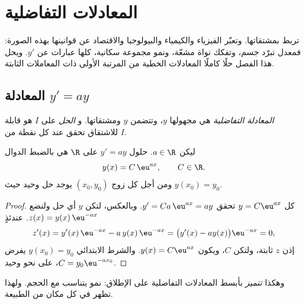 \chapter{المعادلات التفاضلية}\label{ch:g12:diffeq}

تربط   بمشتقاتها. وتعبّر الفيزياء
والكيمياء والبيولوجيا والاقتصاد عن قوانينها بهذه الصورة: فمعدل
تبرّد جسم، وتفكك نواة مشعّة، ونمو
مجموعة سكانية، كلها عبارات عن $y'$. ويحل هذا الفصل حلًا كاملًا
المعادلات الخطية من المرتبة الأولى ذات المعاملات الثابتة.

\section{المعادلة \texorpdfstring{$y' = ay$}{y' = ay}}

\begin{definition}\label{def:g12:diffeq:ode}
\emph{المعادلة التفاضلية} هي 
مجهولها  $y$، وتتضمن $y$ ومشتقاتها. و
\emph{الحل} على  $I$ هو  قابلة للاشتقاق تحقق
 عند كل نقطة من $I$.
\end{definition}

\begin{theorem}[حلول $y' = ay$]\label{thm:g12:diffeq:homogeneous}
ليكن $a \in \R$. حلول  $y' = ay$ على $\R$ هي بالضبط
الدوال
\[
y(x) = C\,\eu^{ax}, \qquad C \in \R .
\]
ومن أجل كل زوج $(x_0, y_0)$ يوجد حل وحيد حيث
$y(x_0) = y_0$.
\end{theorem}

\begin{proof}
كل  $y = C\eu^{ax}$ تحقق $y' = Ca\,\eu^{ax} = ay$. وبالعكس، لتكن $y$
أي حل ولنضع $z(x) = y(x)\,\eu^{-ax}$. عندئذٍ
\[
z'(x) = y'(x)\,\eu^{-ax} - a\,y(x)\,\eu^{-ax}
= \bigl(y'(x) - a y(x)\bigr)\eu^{-ax} = 0,
\]
إذن $z$ ثابتة، ولتكن $C$، ويكون $y(x) = C\eu^{ax}$. والشرط الابتدائي
$y(x_0) = y_0$ يفرض $C = y_0 \eu^{-a x_0}$، على نحو وحيد.
\end{proof}

\begin{remark}
وهكذا \emph{تتميز}  بأبسط المعادلات
التفاضلية على الإطلاق: نمو يتناسب مع الحجم. ولهذا تظهر
في كل مكان من الطبيعة.
\end{remark}


